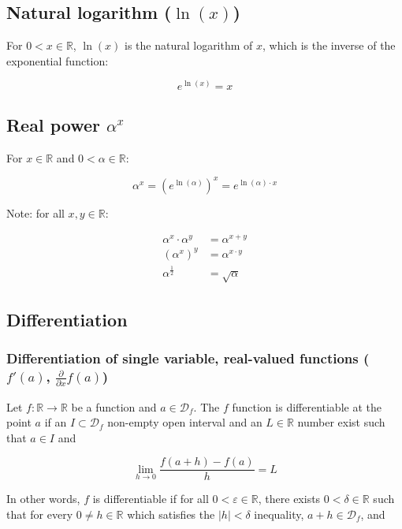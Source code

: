 \documentclass[titlepage]{article}
\begin{document}
      \subsection{Natural logarithm ($\ln(x)$)}

        For $0 < x \in \mathbb{R}$, $\ln(x)$ is the natural logarithm of $x$,
        which is the inverse of the exponential function:

        $$e^{\ln(x)} = x$$

      \subsection{Real power $\alpha^x$}

        For $x \in \mathbb{R}$ and $0 < \alpha \in \mathbb{R}$:

        $$
          \alpha^x = \left( e^{\ln(\alpha)} \right)^x = e^{\ln(\alpha) \cdot x}
        $$

        Note: for all $x, y \in \mathbb{R}$:

        \begin{align*}
          \alpha^x \cdot \alpha^y & = \alpha^{x+y} \\
          \left( \alpha^x \right)^y & = \alpha^{x \cdot y} \\
          \alpha^\frac{1}{2} & = \sqrt{\alpha}
        \end{align*}

      \subsection{Differentiation}

        \subsubsection{%
          Differentiation of single variable, real-valued functions
          ($f'(a)$, $\frac{\partial}{\partial x}f(a)$)
        }

          Let $f : \mathbb{R} \rightarrow \mathbb{R}$ be a function and
          $a \in \mathcal{D}_f$. The $f$ function is differentiable at the point
          $a$ if an $I \subset \mathcal{D}_f$ non-empty open interval and an
          $L \in \mathbb{R}$ number exist such that $a \in I$ and

          $$
            \lim_{h \to 0} \frac{f(a+h) - f(a)}{h} = L
          $$

          In other words, $f$ is differentiable if for all
          $0 < \varepsilon \in \mathbb{R}$, there exists
          $0 < \delta \in \mathbb{R}$ such that for every
          $0 \neq h \in \mathbb{R}$ which satisfies the $|h| < \delta$
          inequality, $a+h \in \mathcal{D}_f$, and
\end{document}
